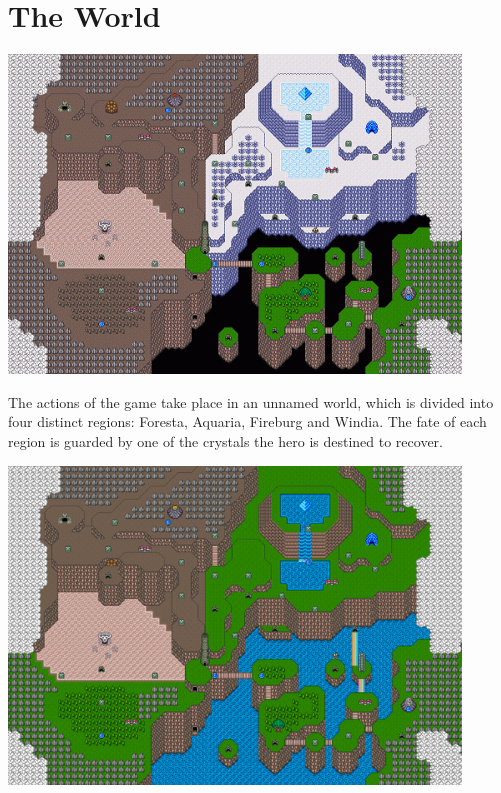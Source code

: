 \chapter{The World}

\begin{center}
	\includegraphics[width=0.9\textwidth]{./resources/map/world}
\end{center}

The actions of the game take place in an unnamed world, which is divided into four distinct regions: Foresta, Aquaria, Fireburg and Windia. The fate of each region is guarded by one of the crystals the hero is destined to recover.

\begin{center}
	\includegraphics[width=0.9\textwidth]{./resources/map/world_final}
\end{center}





\newpage

\newpage

\newpage

\newpage

